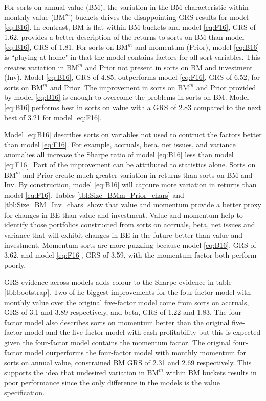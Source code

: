 For sorts on annual value (BM), the variation in the BM characteristic within
monthly value ($\text{BM}^m$) buckets drives the disappointing GRS results for
model \ref{eq:B16}.
In contrast, BM is flat within BM buckets and model \ref{eq:F16}, GRS of 1.62,
provides a better description of the returns to sorts on BM than model
\ref{eq:B16}, GRS of 1.81.
For sorts on $\text{BM}^m$ and momentum (Prior), model \ref{eq:B16} is
``playing at home" in that the model contains factors for all sort variables.
This creates variation in $\text{BM}^m$ and Prior not present in sorts on BM
and investment (Inv). Model \ref{eq:B16}, GRS of 4.85, outperforms model
\ref{eq:F16}, GRS of 6.52, for sorts on $\text{BM}^m$ and Prior.
The improvement in sorts on $\text{BM}^m$ and Prior provided by model
\ref{eq:B16} is enough to overcome the problems in sorts on BM.
Model \ref{eq:B16} performs best in sorts on value with a GRS of 2.83 compared
to the next best of 3.21 for model \ref{eq:F16}.

Model \ref{eq:B16} describes sorts on
variables not used to contruct the factors better than model \ref{eq:F16}.
For example, accruals, beta, net issues, and variance anomalies all
increase the Sharpe ratio of model \ref{eq:B16} less than model \ref{eq:F16}.
Part of the improvement can be attributed to statistics alone.
Sorts on $\text{BM}^m$ and Prior create much greater variation in returns than
sorts on BM and Inv.
By construction, model \ref{eq:B16} will capture more variation in returns than
model \ref{eq:F16}.
Tables \ref{tbl:Size_BMm_Prior_chars} and \ref{tbl:Size_BM_Inv_chars} show that
value and momentum provide a better proxy for changes in BE than value and
investment.
Value and momentum help to identify those portfolios constructed from sorts on
accruals, beta, net issues and variance that will exhibit changes in BE in the
future better than value and investment.
Momentum sorts are more puzzling because model \ref{eq:B16}, GRS of 3.62,
and model \ref{eq:F16}, GRS of 3.59, with the momentum factor both perform
poorly.

GRS evidence across models adds colour to the Sharpe evidence in table
\ref{tbl:bootstrap}.
Two of he biggest improvements for the four-factor model with monthly value
over the original five-factor model come from sorts on accruals,
GRS of 3.1 and 3.89 respectively, and beta, GRS of 1.22 and 1.83.
The four-factor model also describes sorts on momentum better than the original
five-factor model and the five-factor model with cash profitability but this is
expected given the four-factor model contains the momentum factor.
The original four-factor model ourperforms the four-factor model with monthly
momentum for sorts on annual value, constrained BM GRS of 2.31 and 2.69
respectively.
This supports the idea that undesired variation in $\text{BM}^m$ within BM
buckets results in poor performance since the only difference in the models is
the value specification.

